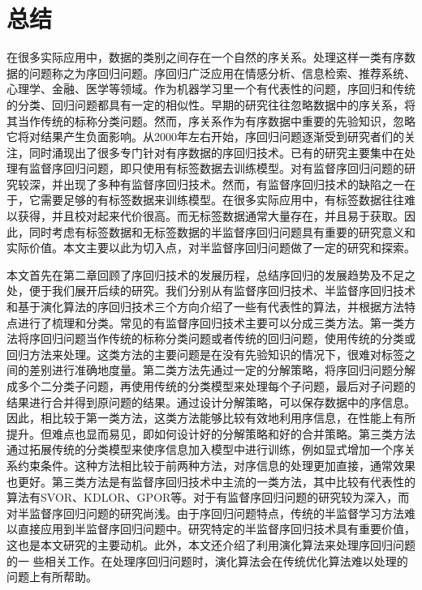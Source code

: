\chapter{总结}
\label{chap:conclusion}

在很多实际应用中，数据的类别之间存在一个自然的序关系。处理这样一类有序数据的问题称之为序回归问题。序回归广泛应用在情感分析、信息检索、推荐系统、心理学、金融、医学等领域。作为机器学习里一个有代表性的问题，序回归和传统的分类、回归问题都具有一定的相似性。早期的研究往往忽略数据中的序关系，将其当作传统的标称分类问题。然而，序关系作为有序数据中重要的先验知识，忽略它将对结果产生负面影响。从2000年左右开始，序回归问题逐渐受到研究者们的关注，同时涌现出了很多专门针对有序数据的序回归技术。已有的研究主要集中在处理有监督序回归问题，即只使用有标签数据去训练模型。对有监督序回归问题的研究较深，并出现了多种有监督序回归技术。然而，有监督序回归技术的缺陷之一在于，它需要足够的有标签数据来训练模型。在很多实际应用中，有标签数据往往难以获得，并且校对起来代价很高。而无标签数据通常大量存在，并且易于获取。因此，同时考虑有标签数据和无标签数据的半监督序回归问题具有重要的研究意义和实际价值。本文主要以此为切入点，对半监督序回归问题做了一定的研究和探索。

本文首先在第二章回顾了序回归技术的发展历程，总结序回归的发展趋势及不足之处，便于我们展开后续的研究。我们分别从有监督序回归技术、半监督序回归技术和基于演化算法的序回归技术三个方向介绍了一些有代表性的算法，并根据方法特点进行了梳理和分类。常见的有监督序回归技术主要可以分成三类方法。第一类方法将序回归问题当作传统的标称分类问题或者传统的回归问题，使用传统的分类或回归方法来处理。这类方法的主要问题是在没有先验知识的情况下，很难对标签之间的差别进行准确地度量。第二类方法先通过一定的分解策略，将序回归问题分解成多个二分类子问题，再使用传统的分类模型来处理每个子问题，最后对子问题的结果进行合并得到原问题的结果。通过设计分解策略，可以保存数据中的序信息。因此，相比较于第一类方法，这类方法能够比较有效地利用序信息，在性能上有所提升。但难点也显而易见，即如何设计好的分解策略和好的合并策略。第三类方法通过拓展传统的分类模型来使序信息加入模型中进行训练，例如显式增加一个序关系约束条件。这种方法相比较于前两种方法，对序信息的处理更加直接，通常效果也更好。第三类方法是有监督序回归技术中主流的一类方法，其中比较有代表性的算法有SVOR、KDLOR、GPOR等。对于有监督序回归问题的研究较为深入，而对半监督序回归问题的研究尚浅。由于序回归问题特点，传统的半监督学习方法难以直接应用到半监督序回归问题中。研究特定的半监督序回归技术具有重要价值，这也是本文研究的主要动机。此外，本文还介绍了利用演化算法来处理序回归问题的一 些相关工作。在处理序回归问题时，演化算法会在传统优化算法难以处理的问题上有所帮助。

